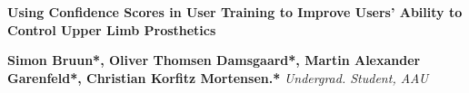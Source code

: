 
%

\begin{center}	
	{\huge\textbf{Using Confidence Scores in User Training to Improve Users' Ability to Control Upper Limb Prosthetics}}
	
	
	{\large \textbf{Simon Bruun*, Oliver Thomsen Damsgaard*, Martin Alexander Garenfeld*, Christian Korfitz Mortensen.*}}
{\small \textit{Undergrad. Student, AAU}}
\end{center}


